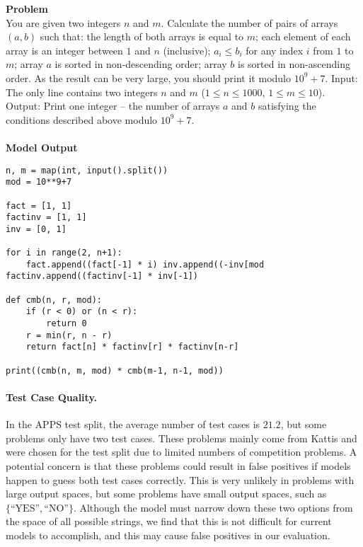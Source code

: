\documentclass{article}
\begin{document}
\begin{figure*}
    \textbf{Problem} \\
     You are given two integers $n$ and $m$. Calculate the number of pairs of arrays $(a, b)$ such that:  the length of both arrays is equal to $m$;  each element of each array is an integer between $1$ and $n$ (inclusive);  $a_i \le b_i$ for any index $i$ from $1$ to $m$;  array $a$ is sorted in non-descending order;  array $b$ is sorted in non-ascending order. As the result can be very large, you should print it modulo $10^9+7$. Input: The only line contains two integers $n$ and $m$ ($1 \le n \le 1000$, $1 \le m \le 10$). Output: Print one integer – the number of arrays $a$ and $b$ satisfying the conditions described above modulo $10^9+7$.
 \\
 \\
 \textbf{Model Output}
 \begin{small}
 \begin{verbatim}
n, m = map(int, input().split())
mod = 10**9+7

fact = [1, 1]
factinv = [1, 1]
inv = [0, 1]

for i in range(2, n+1):
    fact.append((fact[-1] * i) inv.append((-inv[mod factinv.append((factinv[-1] * inv[-1]) 

def cmb(n, r, mod):
    if (r < 0) or (n < r):
        return 0
    r = min(r, n - r)
    return fact[n] * factinv[r] * factinv[n-r] 

print((cmb(n, m, mod) * cmb(m-1, n-1, mod)) \end{verbatim}
 \end{small}
    \caption{An example from GPT-2 1.5B. Although the code generated passes 0 test cases, it looks plausible at first glance.}
    \label{fig:interesting_sample_from_1500}
\end{figure*}








\paragraph{Test Case Quality.}
In the APPS test split, the average number of test cases is $21.2$, but some problems only have two test cases. These problems mainly come from Kattis and were chosen for the test split due to limited numbers of competition problems. A potential concern is that these problems could result in false positives if models happen to guess both test cases correctly. This is very unlikely in problems with large output spaces, but some problems have small output spaces, such as $\{\text{``YES''}, \text{``NO''}\}$. Although the model must narrow down these two options from the space of all possible strings, we find that this is not difficult for current models to accomplish, and this may cause false positives in our evaluation.
\end{document}
